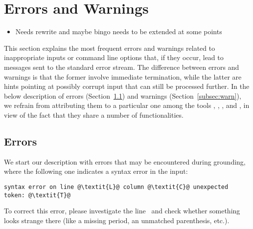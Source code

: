\section{Errors and Warnings}\label{sec:error:warn}

\begin{newstuff}
	\begin{itemize}
		\item Needs rewrite and maybe bingo needs to be extended at some points
	\end{itemize}
\end{newstuff}

This section explains the most frequent errors and warnings
related to inappropriate inputs or command line options that,
if they occur, lead to messages sent to the standard error stream.
The difference between errors and warnings is that the former
involve immediate termination,
while the latter are hints pointing at possibly corrupt input
that can still be processed further.
In the below description of errors (Section~\ref{subsec:error})
and warnings (Section~\ref{subsec:warn}),
we refrain from attributing them to a particular one among the tools
\gringo, \clasp, \clingo, and \iclingo,
in view of the fact that they share a number of functionalities.


\subsection{Errors}\label{subsec:error}

We start our description with errors that may be encountered during grounding,
where the following one indicates a syntax error in the input:
%
\begin{lstlisting}[numbers=none,escapechar=@]
syntax error on line @\textit{L}@ column @\textit{C}@ unexpected token: @\textit{T}@
\end{lstlisting}
%
To correct this error, please investigate the line~
and check whether something looks strange there
(like a missing period, an unmatched parenthesis, etc.).

